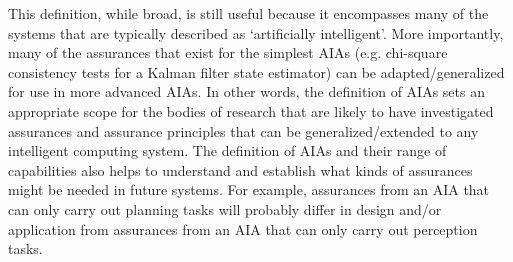 This definition, while broad, is still useful because it encompasses many of the systems that are typically described as `artificially intelligent'. More importantly, many of the assurances that exist for the simplest AIAs (e.g. chi-square consistency tests for a Kalman filter state estimator) can be adapted/generalized for use in more advanced AIAs. 
In other words, the definition of AIAs sets an appropriate scope for the bodies of research that are likely to have investigated assurances and assurance principles that can be generalized/extended to any intelligent computing system. The definition of AIAs and their range of capabilities also helps to understand and establish what kinds of assurances might be needed in future systems. For example, assurances from an AIA that can only carry out planning tasks will probably differ in design and/or application from assurances from an AIA that can only carry out perception tasks. 
